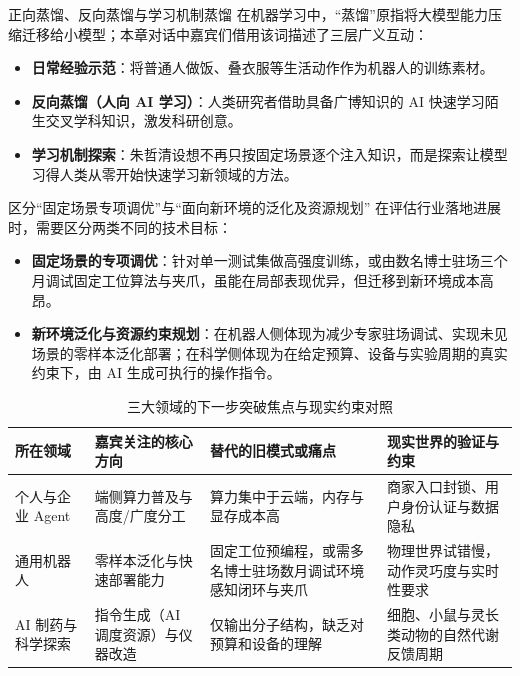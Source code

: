 \documentclass[UTF8,a4paper,11pt,fontset=fandol]{ctexart}
\begin{document}
\begin{knowledgebox}{正向蒸馏、反向蒸馏与学习机制蒸馏}
在机器学习中，“蒸馏”原指将大模型能力压缩迁移给小模型；本章对话中嘉宾们借用该词描述了三层广义互动：
\begin{itemize}
\item \textbf{日常经验示范}：将普通人做饭、叠衣服等生活动作作为机器人的训练素材。
\item \textbf{反向蒸馏（人向 AI 学习）}：人类研究者借助具备广博知识的 AI 快速学习陌生交叉学科知识，激发科研创意。
\item \textbf{学习机制探索}：朱哲清设想不再只按固定场景逐个注入知识，而是探索让模型习得人类从零开始快速学习新领域的方法。
\end{itemize}
\end{knowledgebox}
\begin{warningbox}{区分“固定场景专项调优”与“面向新环境的泛化及资源规划”}
在评估行业落地进展时，需要区分两类不同的技术目标：
\begin{itemize}
\item \textbf{固定场景的专项调优}：针对单一测试集做高强度训练，或由数名博士驻场三个月调试固定工位算法与夹爪，虽能在局部表现优异，但迁移到新环境成本高昂。
\item \textbf{新环境泛化与资源约束规划}：在机器人侧体现为减少专家驻场调试、实现未见场景的零样本泛化部署；在科学侧体现为在给定预算、设备与实验周期的真实约束下，由 AI 生成可执行的操作指令。
\end{itemize}
\end{warningbox}
\begin{table}[H]\centering\small
\caption{三大领域的下一步突破焦点与现实约束对照}
\begin{tabular}{>{\raggedright\arraybackslash}p{\dimexpr(\linewidth-8\tabcolsep)/4\relax}>{\raggedright\arraybackslash}p{\dimexpr(\linewidth-8\tabcolsep)/4\relax}>{\raggedright\arraybackslash}p{\dimexpr(\linewidth-8\tabcolsep)/4\relax}>{\raggedright\arraybackslash}p{\dimexpr(\linewidth-8\tabcolsep)/4\relax}}
\toprule
所在领域 & 嘉宾关注的核心方向 & 替代的旧模式或痛点 & 现实世界的验证与约束\\\midrule
个人与企业 Agent & 端侧算力普及与高度/广度分工 & 算力集中于云端，内存与显存成本高 & 商家入口封锁、用户身份认证与数据隐私\\[4pt]
通用机器人 & 零样本泛化与快速部署能力 & 固定工位预编程，或需多名博士驻场数月调试环境感知闭环与夹爪 & 物理世界试错慢，动作灵巧度与实时性要求\\[4pt]
AI 制药与科学探索 & 指令生成（AI 调度资源）与仪器改造 & 仅输出分子结构，缺乏对预算和设备的理解 & 细胞、小鼠与灵长类动物的自然代谢反馈周期\\[4pt]
\bottomrule\end{tabular}\end{table}
\end{document}
